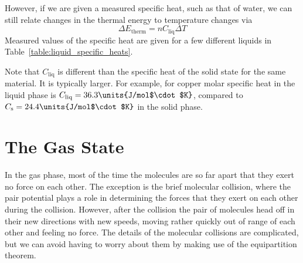 However, if we are given a measured specific heat, such as that of
water, we can still relate changes in the thermal energy to
temperature changes via
\begin{equation}
\Delta E_\text{therm} = n C_\text{liq}\Delta T
\end{equation}
Measured values of the specific heat are given for a few different liquids
in Table~\ref{table:liquid_specific_heats}.


\begin{table}
\begin{center}

 \caption{Molar specific heats of selected liquids.  Data is taken at 
 room temperature.}
\label{table:liquid_specific_heats}
\end{center}
\end{table}

Note that $C_\text{liq}$ is different than the specific heat of the 
solid state for the same material.  It is typically larger.
For example, for copper molar specific heat in the liquid phase
is $C_\text{liq} = 36.3\units{J/mol$\cdot$K}$, compared
to $C_\text{s}=24.4\units{J/mol$\cdot$K}$ in the solid phase. 


\section{The Gas State}
\label{section:TheGasState}

In the gas phase, most of the time the molecules are so far apart that
they exert no force on each other.  The exception is the brief molecular
collision, where the pair potential plays a role in determining the forces
that they exert on each other during the collision.  However, after the
collision the pair of molecules head off in their new directions with
new speeds, moving rather quickly out of range of each other and feeling
no force.  The details of the molecular collisions are complicated,
but we can avoid having to worry about them by making use of the
equipartition theorem.

